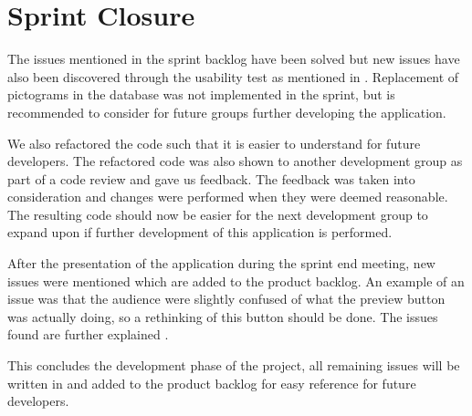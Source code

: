 \section{Sprint Closure}
The issues mentioned in the sprint backlog have been solved but new issues have also been discovered through the usability test as mentioned in .
Replacement of pictograms in the database was not implemented in the sprint, but is recommended to consider for future groups further developing the application.

We also refactored the code such that it is easier to understand for future developers.
The refactored code was also shown to another development group as part of a code review and gave us feedback.
The feedback was taken into consideration and changes were performed when they were deemed reasonable.
The resulting code should now be easier for the next development group to expand upon if further development of this application is performed.

After the presentation of the application during the sprint end meeting, new issues were mentioned which are added to the product backlog.
An example of an issue was that the audience were slightly confused of what the preview button was actually doing, so a rethinking of this button should be done.
The issues found are further explained .

This concludes the development phase of the project, all remaining issues will be written in  and added to the product backlog for easy reference for future developers.